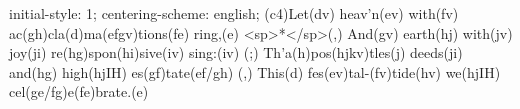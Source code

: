 initial-style: 1;
centering-scheme: english;
(c4)Let(dv) heav'n(ev) with(fv) ac(gh)cla(d)ma(efgv)tions(fe) ring,(e) <sp>*</sp>(,)
And(gv) earth(hj) with(jv) joy(ji) re(hg)spon(hi)sive(iv) sing:(iv) (;)
Th'a(h)pos(hjkv)tles(j) deeds(ji) and(hg) high(hjIH) es(gf)tate(ef/gh) (,)
This(d) fes(ev)tal-(fv)tide(hv) we(hjIH) cel(ge/fg)e(fe)brate.(e)
